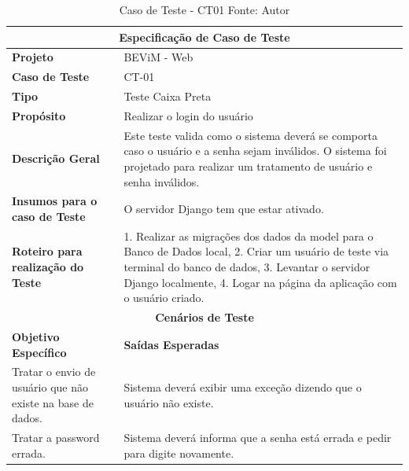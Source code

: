 \begin{table}[H]
    \begin{center}
        \begin{tabular}{|p{5cm}|p{12cm}|}
            \hline
            \multicolumn{2}{|c|}{\textbf{Especificação de Caso de Teste}} \\ \hline
                \textbf{Projeto}                                        & BEViM - Web \\ \hline
                \textbf{Caso de Teste}                             & CT-01 \\ \hline
                \textbf{Tipo}                                             & Teste Caixa Preta \\ \hline
                \textbf{Propósito}                                     & Realizar o login do usuário \\ \hline
                \textbf{Descrição Geral}                           & Este teste valida como o sistema deverá se comporta caso o usuário e a senha sejam inválidos. O sistema foi projetado para realizar um tratamento de usuário e senha inválidos. \\ \hline
                \textbf{Insumos para o caso de Teste}    & O servidor Django tem que estar ativado. \\ \hline
                \textbf{Roteiro para realização do Teste}&  1. Realizar as migrações dos dados da model para o Banco de Dados local, 2. Criar um usuário de teste via terminal do banco de dados, 3. Levantar o servidor Django localmente, 4. Logar na página da aplicação com o usuário criado. \\ \hline
            \multicolumn{2}{|c|}{\textbf{Cenários de Teste}} \\ \hline
                \textbf{Objetivo Específico}                      & \textbf{Saídas Esperadas} \\ \hline
                Tratar o envio de usuário que não existe na base de dados. & Sistema deverá exibir uma exceção dizendo que o usuário não existe. \\ \hline
                Tratar a password errada. & Sistema deverá informa que a senha está errada e pedir para digite novamente. \\ \hline
        \end{tabular}
    \end{center}
    \caption[Caso de Teste - CT01]{Caso de Teste - CT01
    \protect Fonte: Autor}
    \label{CT-01}
\end{table}

